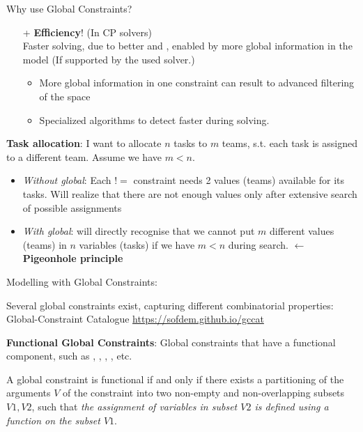 \documentclass{cons-beamer}
\begin{document}
\begin{frame}{Why use Global Constraints?}
  \begin{itemize}
    \item[+] \textbf{Efficiency}! (In CP solvers) \\ Faster solving, due to better  and
             , enabled by more global information in
             the model (If supported by the used solver.)
             \begin{itemize}
               \item More global information in one constraint can result to advanced filtering of the  space
               \item Specialized algorithms to detect  faster during solving.
             \end{itemize}
  \end{itemize}
  \vfill

  \begin{example}
    \textbf{Task allocation}: I want to allocate $n$ tasks to $m$ teams, s.t. each task is assigned to a different team. Assume we have $m < n$. \\
    \begin{itemize}
      \item \textit{Without global}: Each $!=$ constraint needs 2 values (teams) available for its tasks. Will realize that there are not enough values only after extensive search of possible assignments \\
      \item \textit{With global}:  will directly recognise that we cannot put $m$ different values (teams) in $n$ variables (tasks) if we have $m < n$ during search. $\leftarrow$ \textbf{Pigeonhole principle}
    \end{itemize}
  \end{example}
\end{frame}

\begin{frame}{Modelling with Global Constraints:}
  \vfill
  
  Several global constraints exist, capturing different combinatorial properties: \\
  Global-Constraint Catalogue \url{https://sofdem.github.io/gccat}
  \vfill

  \textbf{Functional Global Constraints}: Global constraints that have a functional component, such as , , , , etc.
  \vfill

  \begin{definition}
    A global constraint  is functional if and only if there exists a partitioning of the arguments $V$ of the constraint into two non-empty and non-overlapping subsets $V1, V2$, such that \textit{the assignment of variables in subset $V2$ is defined using a function on the subset $V1$}.
  \end{definition}
\end{frame}
\end{document}

